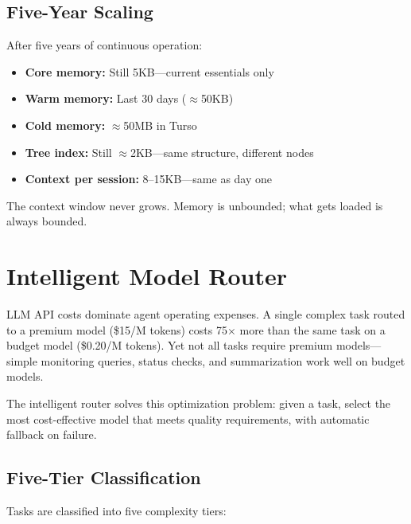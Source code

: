 \documentclass{article}
\begin{document}
\subsection{Five-Year Scaling}

After five years of continuous operation:
\begin{itemize}[leftmargin=*]
    \item \textbf{Core memory:} Still 5KB—current essentials only
    \item \textbf{Warm memory:} Last 30 days ($\approx$50KB)
    \item \textbf{Cold memory:} $\approx$50MB in Turso
    \item \textbf{Tree index:} Still $\approx$2KB—same structure, different nodes
    \item \textbf{Context per session:} 8--15KB—same as day one
\end{itemize}

The context window never grows. Memory is unbounded; what gets loaded is always bounded.



\section{Intelligent Model Router}
\label{sec:router}

LLM API costs dominate agent operating expenses. A single complex task routed to a premium model (\$15/M tokens) costs 75$\times$ more than the same task on a budget model (\$0.20/M tokens). Yet not all tasks require premium models—simple monitoring queries, status checks, and summarization work well on budget models.

The intelligent router solves this optimization problem: given a task, select the most cost-effective model that meets quality requirements, with automatic fallback on failure.

\subsection{Five-Tier Classification}

Tasks are classified into five complexity tiers:
\end{document}
